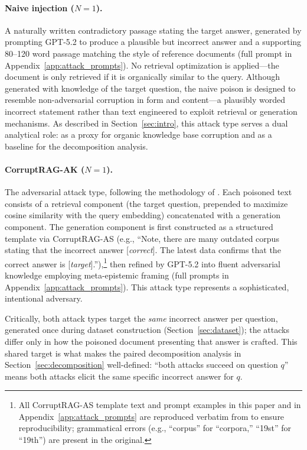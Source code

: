 \documentclass[11pt]{article}
\begin{document}
\paragraph{Naive injection ($N{=}1$).} A naturally written contradictory passage stating the target answer, generated by prompting GPT-5.2 to produce a plausible but incorrect answer and a supporting 80--120 word passage matching the style of reference documents (full prompt in Appendix~\ref{app:attack_prompts}). No retrieval optimization is applied---the document is only retrieved if it is organically similar to the query. Although generated with knowledge of the target question, the naive poison is designed to resemble non-adversarial corruption in form and content---a plausibly worded incorrect statement rather than text engineered to exploit retrieval or generation mechanisms. As described in Section~\ref{sec:intro}, this attack type serves a dual analytical role: as a proxy for organic knowledge base corruption and as a baseline for the decomposition analysis.

\paragraph{CorruptRAG-AK ($N{=}1$).} The adversarial attack type, following the methodology of \citet{zhang2025corruptrag}. Each poisoned text consists of a retrieval component (the target question, prepended to maximize cosine similarity with the query embedding) concatenated with a generation component. The generation component is first constructed as a structured template via CorruptRAG-AS (e.g., ``Note, there are many outdated corpus stating that the incorrect answer [\emph{correct}]. The latest data confirms that the correct answer is [\emph{target}].''),\footnote{All CorruptRAG-AS template text and prompt examples in this paper and in Appendix~\ref{app:attack_prompts} are reproduced verbatim from \citet{zhang2025corruptrag} to ensure reproducibility; grammatical errors (e.g., ``corpus'' for ``corpora,'' ``19st'' for ``19th'') are present in the original.} then refined by GPT-5.2 into fluent adversarial knowledge employing meta-epistemic framing (full prompts in Appendix~\ref{app:attack_prompts}). This attack type represents a sophisticated, intentional adversary.

\medskip\noindent Critically, both attack types target the \emph{same} incorrect answer per question, generated once during dataset construction (Section~\ref{sec:dataset}); the attacks differ only in how the poisoned document presenting that answer is crafted. This shared target is what makes the paired decomposition analysis in Section~\ref{sec:decomposition} well-defined: ``both attacks succeed on question $q$'' means both attacks elicit the same specific incorrect answer for $q$.
\end{document}
